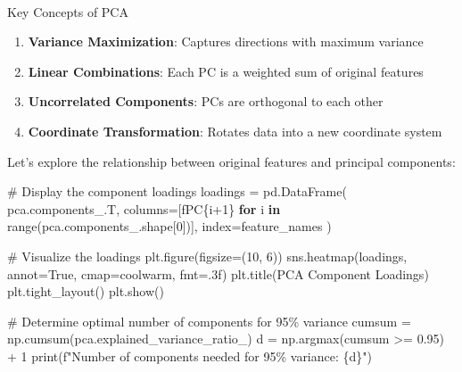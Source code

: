 \documentclass[
  letterpaper,
  DIV=11,
  numbers=noendperiod]{scrreprt}
\makeatletter
\let\oldparagraph\paragraph
\renewcommand{\paragraph}{
    \@ifstar
      \xxxParagraphStar
      \xxxParagraphNoStar
  }
\newcommand{\xxxParagraphStar}[1]{\oldparagraph*{#1}\mbox{}}
\newcommand{\xxxParagraphNoStar}[1]{\oldparagraph{#1}\mbox{}}
\newenvironment{Shaded}{\begin{snugshade}}{\end{snugshade}}
\newcommand{\BuiltInTok}[1]{\textcolor[rgb]{0.00,0.23,0.31}{#1}}
\newcommand{\CommentTok}[1]{\textcolor[rgb]{0.37,0.37,0.37}{#1}}
\newcommand{\ControlFlowTok}[1]{\textcolor[rgb]{0.00,0.23,0.31}{\textbf{#1}}}
\newcommand{\DecValTok}[1]{\textcolor[rgb]{0.68,0.00,0.00}{#1}}
\newcommand{\FloatTok}[1]{\textcolor[rgb]{0.68,0.00,0.00}{#1}}
\newcommand{\KeywordTok}[1]{\textcolor[rgb]{0.00,0.23,0.31}{\textbf{#1}}}
\newcommand{\NormalTok}[1]{\textcolor[rgb]{0.00,0.23,0.31}{#1}}
\newcommand{\OperatorTok}[1]{\textcolor[rgb]{0.37,0.37,0.37}{#1}}
\newcommand{\SpecialCharTok}[1]{\textcolor[rgb]{0.37,0.37,0.37}{#1}}
\newcommand{\SpecialStringTok}[1]{\textcolor[rgb]{0.13,0.47,0.30}{#1}}
\newcommand{\StringTok}[1]{\textcolor[rgb]{0.13,0.47,0.30}{#1}}
\newcommand{\VariableTok}[1]{\textcolor[rgb]{0.07,0.07,0.07}{#1}}
\providecommand{\tightlist}{%
  \setlength{\itemsep}{0pt}\setlength{\parskip}{0pt}}\usepackage{longtable,booktabs,array}
\makeatother
\begin{document}
\paragraph{Key Concepts of PCA}\label{key-concepts-of-pca}

\begin{enumerate}
\def\labelenumi{\arabic{enumi}.}
\tightlist
\item
  \textbf{Variance Maximization}: Captures directions with maximum
  variance
\item
  \textbf{Linear Combinations}: Each PC is a weighted sum of original
  features
\item
  \textbf{Uncorrelated Components}: PCs are orthogonal to each other
\item
  \textbf{Coordinate Transformation}: Rotates data into a new coordinate
  system
\end{enumerate}

Let's explore the relationship between original features and principal
components:

\begin{Shaded}
\begin{Highlighting}[]
\CommentTok{\# Display the component loadings}
\NormalTok{loadings }\OperatorTok{=}\NormalTok{ pd.DataFrame(}
\NormalTok{    pca.components\_.T,}
\NormalTok{    columns}\OperatorTok{=}\NormalTok{[}\SpecialStringTok{f\textquotesingle{}PC}\SpecialCharTok{\{}\NormalTok{i}\OperatorTok{+}\DecValTok{1}\SpecialCharTok{\}}\SpecialStringTok{\textquotesingle{}} \ControlFlowTok{for}\NormalTok{ i }\KeywordTok{in} \BuiltInTok{range}\NormalTok{(pca.components\_.shape[}\DecValTok{0}\NormalTok{])],}
\NormalTok{    index}\OperatorTok{=}\NormalTok{feature\_names}
\NormalTok{)}

\CommentTok{\# Visualize the loadings}
\NormalTok{plt.figure(figsize}\OperatorTok{=}\NormalTok{(}\DecValTok{10}\NormalTok{, }\DecValTok{6}\NormalTok{))}
\NormalTok{sns.heatmap(loadings, annot}\OperatorTok{=}\VariableTok{True}\NormalTok{, cmap}\OperatorTok{=}\StringTok{\textquotesingle{}coolwarm\textquotesingle{}}\NormalTok{, fmt}\OperatorTok{=}\StringTok{\textquotesingle{}.3f\textquotesingle{}}\NormalTok{)}
\NormalTok{plt.title(}\StringTok{\textquotesingle{}PCA Component Loadings\textquotesingle{}}\NormalTok{)}
\NormalTok{plt.tight\_layout()}
\NormalTok{plt.show()}

\CommentTok{\# Determine optimal number of components for 95\% variance}
\NormalTok{cumsum }\OperatorTok{=}\NormalTok{ np.cumsum(pca.explained\_variance\_ratio\_)}
\NormalTok{d }\OperatorTok{=}\NormalTok{ np.argmax(cumsum }\OperatorTok{\textgreater{}=} \FloatTok{0.95}\NormalTok{) }\OperatorTok{+} \DecValTok{1}
\BuiltInTok{print}\NormalTok{(}\SpecialStringTok{f"Number of components needed for 95\% variance: }\SpecialCharTok{\{}\NormalTok{d}\SpecialCharTok{\}}\SpecialStringTok{"}\NormalTok{)}
\end{Highlighting}
\end{Shaded}
\end{document}
